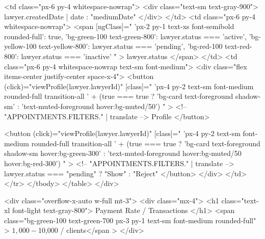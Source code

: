                 <td class="px-6 py-4 whitespace-nowrap">
                  <div class="text-sm text-gray-900">
                    {{ lawyer.createdDate | date : "mediumDate" }}
                  </div>
                </td>
                <td class="px-6 py-4 whitespace-nowrap">
                  <span
                    [ngClass]="{
                      'px-2 py-1 text-xs font-semibold rounded-full': true,
                      'bg-green-100 text-green-800': lawyer.status === 'active',
                      'bg-yellow-100 text-yellow-800':
                        lawyer.status === 'pending',
                      'bg-red-100 text-red-800': lawyer.status === 'inactive'
                    }"
                  >
                    {{ lawyer.status }}
                  </span>
                </td>
                <td class="px-6 py-4 whitespace-nowrap text-sm font-medium">
                  <div class="flex items-center justify-center space-x-4">
                    <button
                      (click)="viewProfile(lawyer.lawyerId)"
                      [class]="
                        'px-4 py-2 text-sm font-medium rounded-full transition-all ' +
                        (true === true
                          ? 'bg-card text-foreground shadow-sm'
                          : 'text-muted-foreground hover:bg-muted/50')
                      "
                    >
                      <!-- {{ "APPOINTMENTS.FILTERS." | translate }} -->
                      Profile
                    </button>

                    <button
                      (click)="viewProfile(lawyer.lawyerId)"
                      [class]="
                        'px-4 py-2 text-sm font-medium rounded-full transition-all ' +
                        (true === true
                          ? 'bg-card text-foreground shadow-sm hover:bg-green-300'
                          : 'text-muted-foreground hover:bg-muted/50 hover:bg-red-300')
                      "
                    >
                      <!-- {{ "APPOINTMENTS.FILTERS." | translate }} -->
                      {{ lawyer.status === "pending" ? "Show" : "Reject" }}
                    </button>
                  </div>
                </td>
              </tr>
            </tbody>
          </table>
        </div>

        <div class="overflow-x-auto w-full mt-3">
          <div class="mx-4">
            <h1 class="text-xl font-light text-gray-800">
              Payment Rate / Transactions
            </h1>
            <span
              class="bg-green-100 text-green-700 px-3 py-1 text-sm font-medium rounded-full"
            >
              $1,000 - $10,000 / clients</span
            >
          </div>

